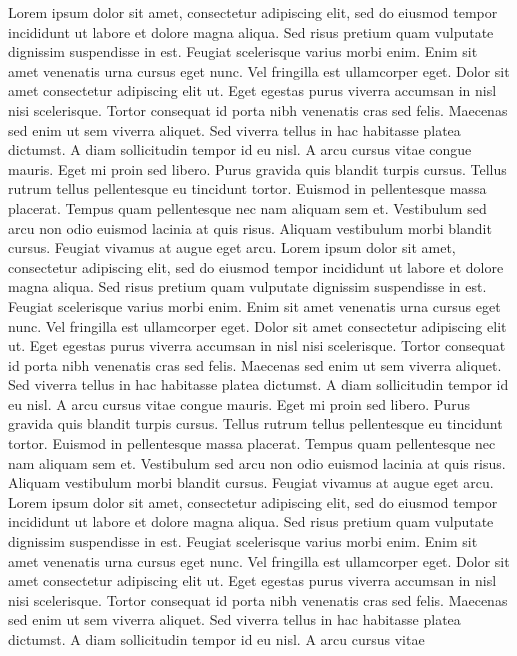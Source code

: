 Lorem ipsum dolor sit amet, consectetur adipiscing elit, sed do eiusmod
tempor incididunt ut labore et dolore magna aliqua. Sed risus pretium
quam vulputate dignissim suspendisse in est. Feugiat scelerisque varius
morbi enim. Enim sit amet venenatis urna cursus eget nunc. Vel fringilla
 est ullamcorper eget. Dolor sit amet consectetur adipiscing elit ut.
Eget egestas purus viverra accumsan in nisl nisi scelerisque. Tortor
consequat id porta nibh venenatis cras sed felis. Maecenas sed enim ut
sem viverra aliquet. Sed viverra tellus in hac habitasse platea
dictumst. A diam sollicitudin tempor id eu nisl. A arcu cursus vitae
congue mauris. Eget mi proin sed libero. Purus gravida quis blandit
turpis cursus. Tellus rutrum tellus pellentesque eu tincidunt tortor.
Euismod in pellentesque massa placerat. Tempus quam pellentesque nec nam
 aliquam sem et. Vestibulum sed arcu non odio euismod lacinia at quis
risus. Aliquam vestibulum morbi blandit cursus. Feugiat vivamus at augue
 eget arcu.
Lorem
 ipsum dolor sit amet, consectetur adipiscing elit, sed do eiusmod
tempor incididunt ut labore et dolore magna aliqua. Sed risus pretium
quam vulputate dignissim suspendisse in est. Feugiat scelerisque varius
morbi enim. Enim sit amet venenatis urna cursus eget nunc. Vel fringilla
 est ullamcorper eget. Dolor sit amet consectetur adipiscing elit ut.
Eget egestas purus viverra accumsan in nisl nisi scelerisque. Tortor
consequat id porta nibh venenatis cras sed felis. Maecenas sed enim ut
sem viverra aliquet. Sed viverra tellus in hac habitasse platea
dictumst. A diam sollicitudin tempor id eu nisl. A arcu cursus vitae
congue mauris. Eget mi proin sed libero. Purus gravida quis blandit
turpis cursus. Tellus rutrum tellus pellentesque eu tincidunt tortor.
Euismod in pellentesque massa placerat. Tempus quam pellentesque nec nam
 aliquam sem et. Vestibulum sed arcu non odio euismod lacinia at quis
risus. Aliquam vestibulum morbi blandit cursus. Feugiat vivamus at augue
 eget arcu.
Lorem
 ipsum dolor sit amet, consectetur adipiscing elit, sed do eiusmod
tempor incididunt ut labore et dolore magna aliqua. Sed risus pretium
quam vulputate dignissim suspendisse in est. Feugiat scelerisque varius
morbi enim. Enim sit amet venenatis urna cursus eget nunc. Vel fringilla
 est ullamcorper eget. Dolor sit amet consectetur adipiscing elit ut.
Eget egestas purus viverra accumsan in nisl nisi scelerisque. Tortor
consequat id porta nibh venenatis cras sed felis. Maecenas sed enim ut
sem viverra aliquet. Sed viverra tellus in hac habitasse platea
dictumst. A diam sollicitudin tempor id eu nisl. A arcu cursus vitae
